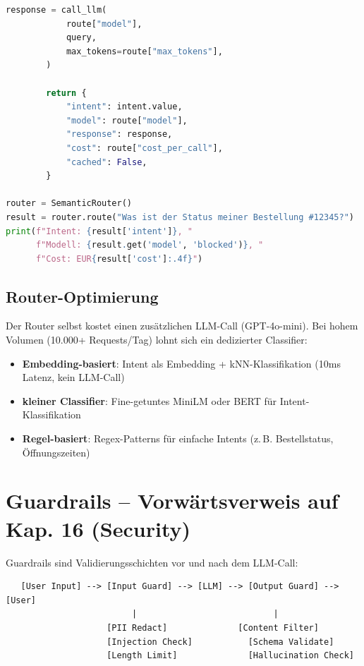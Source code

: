 \begin{lstlisting}[language=Python, caption=Semantic Router mit Intent-Klassifikation]
        response = call_llm(
            route["model"],
            query,
            max_tokens=route["max_tokens"],
        )

        return {
            "intent": intent.value,
            "model": route["model"],
            "response": response,
            "cost": route["cost_per_call"],
            "cached": False,
        }

router = SemanticRouter()
result = router.route("Was ist der Status meiner Bestellung #12345?")
print(f"Intent: {result['intent']}, "
      f"Modell: {result.get('model', 'blocked')}, "
      f"Cost: EUR{result['cost']:.4f}")
\end{lstlisting}

\subsection{Router-Optimierung}

Der Router selbst kostet einen zusätzlichen LLM-Call (GPT-4o-mini). Bei hohem Volumen (10.000+ Requests/Tag) lohnt sich ein dedizierter Classifier:

\begin{itemize}[leftmargin=*]
    \item \textbf{Embedding-basiert}: Intent als Embedding + kNN-Klassifikation (10ms Latenz, kein LLM-Call)
    \item \textbf{kleiner Classifier}: Fine-getuntes MiniLM oder BERT für Intent-Klassifikation
    \item \textbf{Regel-basiert}: Regex-Patterns für einfache Intents (z.\,B. Bestellstatus, Öffnungszeiten)
\end{itemize}


\section{Guardrails -- Vorwärtsverweis auf Kap. 16 (Security)}

Guardrails sind Validierungsschichten vor und nach dem LLM-Call:

\begin{verbatim}
   [User Input] --> [Input Guard] --> [LLM] --> [Output Guard] --> [User]
                         |                           |
                    [PII Redact]              [Content Filter]
                    [Injection Check]           [Schema Validate]
                    [Length Limit]              [Hallucination Check]
\end{verbatim}

